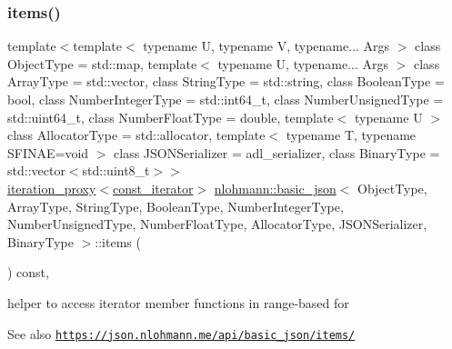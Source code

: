 \subsubsection{\texorpdfstring{items()}{items()}\hspace{0.1cm}{\footnotesize\ttfamily [2/2]}}
{\footnotesize\ttfamily template$<$template$<$ typename U, typename V, typename... Args $>$ class Object\+Type = std\+::map, template$<$ typename U, typename... Args $>$ class Array\+Type = std\+::vector, class String\+Type  = std\+::string, class Boolean\+Type  = bool, class Number\+Integer\+Type  = std\+::int64\+\_\+t, class Number\+Unsigned\+Type  = std\+::uint64\+\_\+t, class Number\+Float\+Type  = double, template$<$ typename U $>$ class Allocator\+Type = std\+::allocator, template$<$ typename T, typename S\+F\+I\+N\+A\+E=void $>$ class J\+S\+O\+N\+Serializer = adl\+\_\+serializer, class Binary\+Type  = std\+::vector$<$std\+::uint8\+\_\+t$>$$>$ \\
\hyperlink{classnlohmann_1_1detail_1_1iteration__proxy}{iteration\+\_\+proxy}$<$\hyperlink{classnlohmann_1_1basic__json_aebd2cfa7e4ded4e97cde9269bfeeea38}{const\+\_\+iterator}$>$ \hyperlink{classnlohmann_1_1basic__json}{nlohmann\+::basic\+\_\+json}$<$ Object\+Type, Array\+Type, String\+Type, Boolean\+Type, Number\+Integer\+Type, Number\+Unsigned\+Type, Number\+Float\+Type, Allocator\+Type, J\+S\+O\+N\+Serializer, Binary\+Type $>$\+::items (\begin{DoxyParamCaption}{ }\end{DoxyParamCaption}) const\hspace{0.3cm}{\ttfamily [inline]}, {\ttfamily [noexcept]}}



helper to access iterator member functions in range-\/based for 

\begin{DoxySeeAlso}{See also}
\href{https://json.nlohmann.me/api/basic_json/items/}{\tt https\+://json.\+nlohmann.\+me/api/basic\+\_\+json/items/} 
\end{DoxySeeAlso}
\mbox{\label{classnlohmann_1_1basic__json_a22e2e5b0e68d9d7c63be2cada5187259}} 
